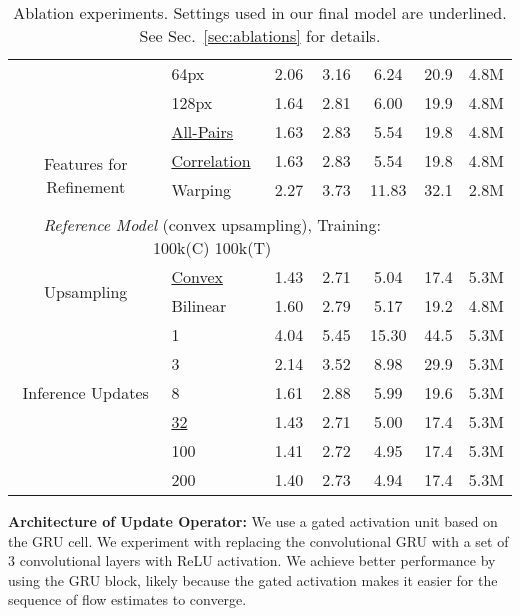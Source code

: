 \documentclass[runningheads]{llncs}
\begin{document}
\begin{table}[t]
{\begin{tabular}{clccccc}
                                        & 64px & 2.06 & 3.16 & 6.24 & 20.9 & 4.8M\\
                                        & 128px & 1.64 & 2.81 & 6.00 & 19.9 & 4.8M\\
                                        & \underline{All-Pairs} & 1.63 & 2.83 & 5.54 & 19.8 & 4.8M \\  \midrule
\multirow{2}{*}{Features for Refinement}         & \underline{Correlation} & 1.63 & 2.83 & 5.54 & 19.8 & 4.8M \\ 
                                        & Warping & 2.27 & 3.73 & 11.83 & 32.1 & 2.8M \\ \midrule

\rule{0pt}{2ex} \\
\multicolumn{5}{c}{\emph{Reference Model} (convex upsampling), Training: 100k(C)  100k(T)} \\
\midrule
\multirow{2}{*}{Upsampling}         & \underline{Convex} & 1.43 & 2.71 & 5.04  & 17.4 & 5.3M \\
                                        & Bilinear & 1.60 & 2.79 & 5.17 & 19.2 & 4.8M \\ \midrule
\multirow{5}{*}{Inference Updates}  & 1 & 4.04 & 5.45 & 15.30 & 44.5 & 5.3M \\
                                  & 3 & 2.14 & 3.52 & 8.98 & 29.9 & 5.3M \\
                                  & 8 & 1.61 & 2.88 & 5.99 & 19.6 & 5.3M \\
                                  & \underline{32} & 1.43 & 2.71 & 5.00 & 17.4 & 5.3M \\ 
                                  & 100 & 1.41 & 2.72 & 4.95 & 17.4 & 5.3M \\
                                  & 200 & 1.40 & 2.73 & 4.94 & 17.4 & 5.3M \\ \midrule
\end{tabular}
}
\caption{Ablation experiments. Settings used in our final model are underlined. See Sec.~\ref{sec:ablations} for details.}
\label{table:Ablations}
\end{table}

\smallskip \noindent \textbf{Architecture of Update Operator: } We use a gated activation unit based on the GRU cell. We experiment with replacing the convolutional GRU with a set of 3 convolutional layers with ReLU activation. We achieve better performance by using the GRU block, likely because the gated activation makes it easier for the sequence of flow estimates to converge.
\end{document}
